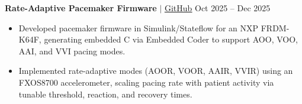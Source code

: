 \documentclass[a4paper]{article}
\begin{document}

\textbf{Rate-Adaptive Pacemaker Firmware} $|$
\href{https://github.com/danielzhang122/sfwreng-3k04-pacemaker}{\underline{GitHub}}
\hfill Oct 2025 -- Dec 2025
\vspace{1mm}
\begin{itemize}
    \item Developed pacemaker firmware in Simulink/Stateflow for an NXP FRDM-K64F, generating embedded C via Embedded Coder to support AOO, VOO, AAI, and VVI pacing modes.
    \item Implemented rate-adaptive modes (AOOR, VOOR, AAIR, VVIR) using an FXOS8700 accelerometer, scaling pacing rate with patient activity via tunable threshold, reaction, and recovery times.
\end{itemize}

\end{document}
